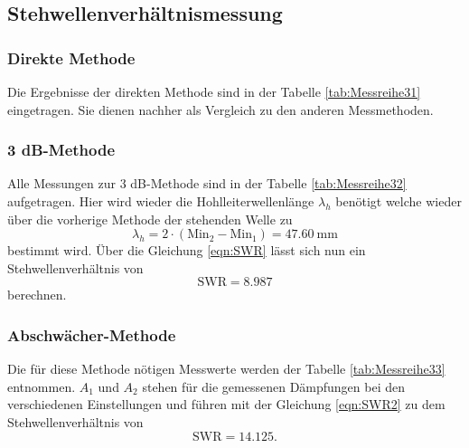 \subsection{Stehwellenverhältnismessung}

\subsubsection{Direkte Methode}
Die Ergebnisse der direkten Methode sind in der Tabelle \ref{tab:Messreihe31} eingetragen. Sie dienen nachher als Vergleich zu den anderen Messmethoden.

\subsubsection{3 dB-Methode}
Alle Messungen zur 3 dB-Methode sind in der Tabelle \ref{tab:Messreihe32} aufgetragen. Hier wird wieder die Hohlleiterwellenlänge $\lambda_h$ 
benötigt welche wieder über die vorherige Methode der stehenden Welle zu
\begin{equation*}
\lambda_h = 2 \cdot (\text{Min}_2 - \text{Min}_1) = \SI{47.60}{\milli\meter}
\end{equation*}
bestimmt wird.
Über die Gleichung \ref{eqn:SWR} lässt sich nun ein Stehwellenverhältnis von
\begin{equation*}
\text{SWR} = 8.987
\end{equation*}
berechnen.

\subsubsection{Abschwächer-Methode}
Die für diese Methode nötigen Messwerte werden der Tabelle \ref{tab:Messreihe33} entnommen.
$A_1$ und $A_2$ stehen für die gemessenen Dämpfungen bei den verschiedenen Einstellungen und führen mit der Gleichung 
\eqref{eqn:SWR2} zu dem Stehwellenverhältnis von
\begin{equation*}
\text{SWR} = 14.125.
\end{equation*}
